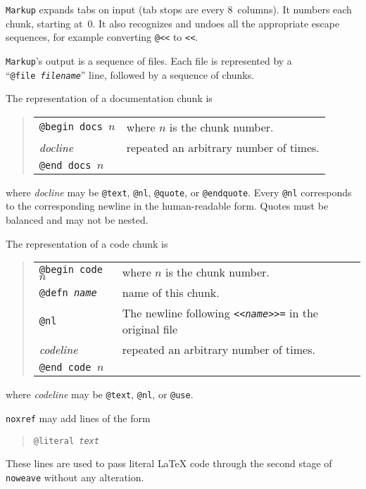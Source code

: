 {\tt Markup} expands tabs on input (tab stops are every 8~columns).
It numbers each chunk, starting at~0.
It also recognizes and undoes all the appropriate escape sequences,
for example converting {\tt @<<} to {\tt <<}.

{\tt Markup}'s output is a sequence of files.
Each file is represented by a ``{\tt @file~{\it filename}}'' line,
followed by a sequence of chunks.

The representation of a documentation chunk is
\begin{quote}
\begin{tabular}{ll}
\tt @begin docs $n$&where $n$ is the chunk number.\\
{\it docline}&repeated an arbitrary number of times.\\
\tt @end docs $n$
\end{tabular}
\end{quote}
where {\it docline} may be {\tt @text}, {\tt @nl}, {\tt @quote}, or
{\tt @endquote}.
Every {\tt @nl} corresponds to the corresponding newline in the
human-readable form.
Quotes must be balanced and may not be nested.

The representation of a code chunk is
\begin{quote}
\begin{tabular}{ll}
\tt @begin code $n$&where $n$ is the chunk number.\\
\tt @defn {\it name}&name of this chunk.\\
\tt @nl&The newline following {\tt <<{\it name}>>=} in the original file\\
{\it codeline}&repeated an arbitrary number of times.\\
\tt @end code $n$
\end{tabular}
\end{quote}
where {\it codeline} may be {\tt @text}, {\tt @nl}, or {\tt @use}.

{\tt noxref} may add lines of the form
\begin{quote}
\tt @literal {\it text}
\end{quote}
These lines are used to pass literal {\LaTeX} code through the second
stage of {\tt noweave} without any alteration.


